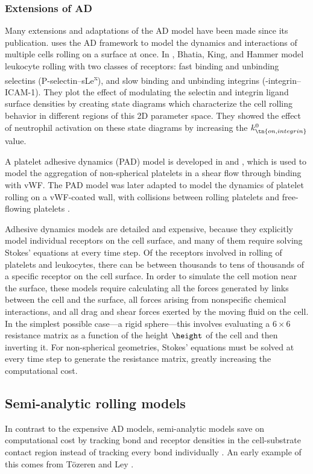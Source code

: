 \subsubsection{Extensions of AD}
\label{sec:extensions-ad}

Many extensions and adaptations of the AD model have been made since
its publication. \cite{King2001} uses the AD framework to model the
dynamics and interactions of multiple cells rolling on a surface at
once. In \cite{Bhatia2003}, Bhatia, King, and Hammer model leukocyte
rolling with two classes of receptors: fast binding and unbinding
selectins (P-selectin--sLe\textsuperscript{x}), and slow binding and
unbinding integrins (-integrin--ICAM-1). They plot the effect
of modulating the selectin and integrin ligand surface densities by
creating state diagrams which characterize the cell rolling behavior
in different regions of this 2D parameter space. They showed the
effect of neutrophil activation on these state diagrams by increasing
the $k_\tn{on, integrin}^0$ value.

A platelet adhesive dynamics (PAD) model is developed in
\cite{Mody2008a} and \cite{Mody2008b}, which is used to model the
aggregation of non-spherical platelets in a shear flow through binding
with vWF. The PAD model was later adapted to model the dynamics of
platelet rolling on a vWF-coated wall, with collisions between rolling
platelets and free-flowing platelets \cite{Wang2013}.

Adhesive dynamics models are detailed and expensive, because they
explicitly model individual receptors on the cell surface, and many of
them require solving Stokes' equations at every time step. Of the
receptors involved in rolling of platelets and leukocytes, there can
be between thousands to tens of thousands of a specific receptor on
the cell surface. In order to simulate the cell motion near the
surface, these models require calculating all the forces generated by
links between the cell and the surface, all forces arising from
nonspecific chemical interactions, and all drag and shear forces
exerted by the moving fluid on the cell. In the simplest possible
case---a rigid sphere---this involves evaluating a $6 \times 6$
resistance matrix as a function of the height $\height$ of the cell
and then inverting it. For non-spherical geometries, Stokes' equations
must be solved at every time step to generate the resistance matrix,
greatly increasing the computational cost.

\subsection{Semi-analytic rolling models}
\label{sec:semi-analytic}

In contrast to the expensive AD models, semi-analytic models save on
computational cost by tracking bond and receptor densities in the
cell-substrate contact region instead of tracking every bond
individually \cite{Pospieszalska2009}. An early example of this comes
from T\"{o}zeren and Ley \cite{Tozeren1992}. %
